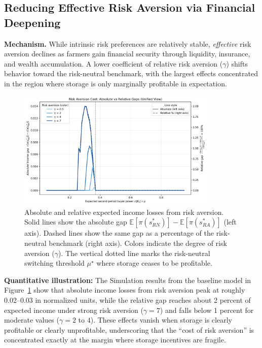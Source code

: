 \subsection{Reducing Effective Risk Aversion via Financial Deepening}

\textbf{Mechanism.} While intrinsic risk preferences are relatively stable, \emph{effective} risk aversion declines as farmers gain financial security through liquidity, insurance, and wealth accumulation. A lower coefficient of relative risk aversion ($\gamma$) shifts behavior toward the risk-neutral benchmark, with the largest effects concentrated in the region where storage is only marginally profitable in expectation.


\begin{figure}[ht!]
    \centering
    \includegraphics[width=0.85\textwidth]{model_figures/income_gap_vs_mu_(unified).png}
    \caption{Absolute and relative expected income losses from risk aversion. 
    Solid lines show the absolute gap $\mathbb{E}[\pi(s^*_{RN})]-\mathbb{E}[\pi(s^*_{RA})]$ (left axis). 
    Dashed lines show the same gap as a percentage of the risk-neutral benchmark (right axis). 
    Colors indicate the degree of risk aversion ($\gamma$). 
    The vertical dotted line marks the risk-neutral switching threshold $\mu^\star$ where storage ceases to be profitable.}
    \label{fig:unified_gap_plot}
\end{figure}


\textbf{Quantitative illustration:} The Simulation results from the baseline model in Figure~\ref{fig:unified_gap_plot} show that absolute income losses from risk aversion peak at roughly 0.02--0.03 in normalized units, while the relative gap reaches about 2 percent of expected income under strong risk aversion ($\gamma=7$) and falls below 1 percent for moderate values ($\gamma=2$ to $4$). These effects vanish when storage is clearly profitable or clearly unprofitable, underscoring that the ``cost of risk aversion'' is concentrated exactly at the margin where storage incentives are fragile.


